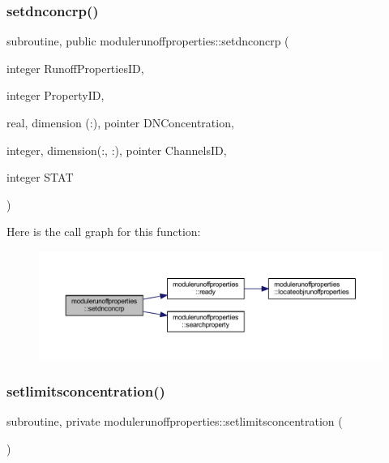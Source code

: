 \subsubsection{\texorpdfstring{setdnconcrp()}{setdnconcrp()}}
{\footnotesize\ttfamily subroutine, public modulerunoffproperties\+::setdnconcrp (\begin{DoxyParamCaption}\item[{integer}]{Runoff\+Properties\+ID,  }\item[{integer}]{Property\+ID,  }\item[{real, dimension (\+:), pointer}]{D\+N\+Concentration,  }\item[{integer, dimension(\+:, \+:), pointer}]{Channels\+ID,  }\item[{integer}]{S\+T\+AT }\end{DoxyParamCaption})}

Here is the call graph for this function\+:\nopagebreak
\begin{figure}[H]
\begin{center}
\leavevmode
\includegraphics[width=350pt]{namespacemodulerunoffproperties_af1a385e164dd67d336a71fada3a6e2b2_cgraph}
\end{center}
\end{figure}
\mbox{\label{namespacemodulerunoffproperties_aa9620af1c193dc89f2ab50f709f50f32}} 
\subsubsection{\texorpdfstring{setlimitsconcentration()}{setlimitsconcentration()}}
{\footnotesize\ttfamily subroutine, private modulerunoffproperties\+::setlimitsconcentration (\begin{DoxyParamCaption}{ }\end{DoxyParamCaption})\hspace{0.3cm}{\ttfamily [private]}}


